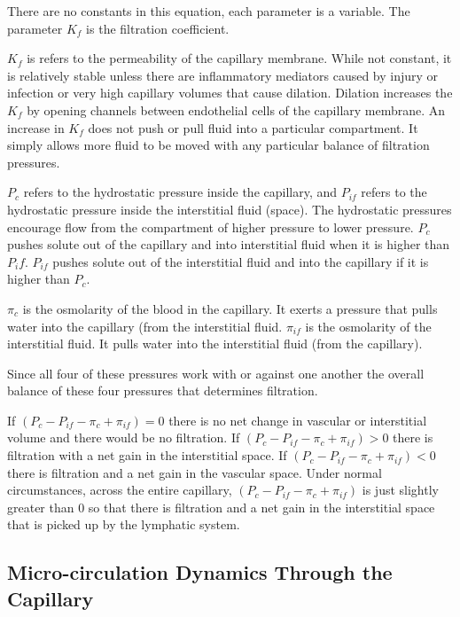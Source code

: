 There are no constants in this equation, each parameter is a variable. The parameter $K_f$ is the filtration coefficient. 

$K_f$ is refers to the permeability of the capillary membrane. While not constant, it is relatively stable unless there are inflammatory mediators caused by injury or infection or very high capillary volumes that cause dilation. Dilation increases the $K_f$ by opening channels between endothelial cells of the capillary membrane. An increase in $K_f$ does not push or pull fluid into a particular compartment. It simply allows more fluid to be moved with any particular balance of filtration pressures.

$P_c$ refers to the hydrostatic pressure inside the capillary, and $P_{if}$ refers to the hydrostatic pressure inside the interstitial fluid (space). The hydrostatic pressures encourage flow from the compartment of higher pressure to lower pressure. $P_c$ pushes solute out of the capillary and into interstitial fluid when it is higher than $P_if$. $P_{if}$ pushes solute out of the interstitial fluid and into the capillary if it is higher than $P_c$.

$\pi_c$ is the osmolarity of the blood in the capillary. It exerts a pressure that pulls water into the capillary (from the interstitial fluid.  $\pi_{if}$ is the osmolarity of the interstitial fluid. It pulls water into the interstitial fluid (from the capillary). 

Since all four of these pressures work with or against one another the overall balance of these four pressures that determines filtration. 

If $(P_c - P_{if} - \pi_c + \pi_{if}) = 0$ there is no net change in vascular or interstitial volume and there would be no filtration. If $(P_c - P_{if} - \pi_c + \pi_{if}) > 0$ there is filtration with a net gain in the interstitial space. If $(P_c - P_{if} - \pi_c + \pi_{if}) < 0$ there is filtration and a net gain in the vascular space. Under normal circumstances, across the entire capillary, $(P_c - P_{if} - \pi_c + \pi_{if})$ is just slightly greater than 0 so that there is filtration and a net gain in the interstitial space that is picked up by the lymphatic system. 

\subsection{Micro-circulation Dynamics Through the Capillary}

